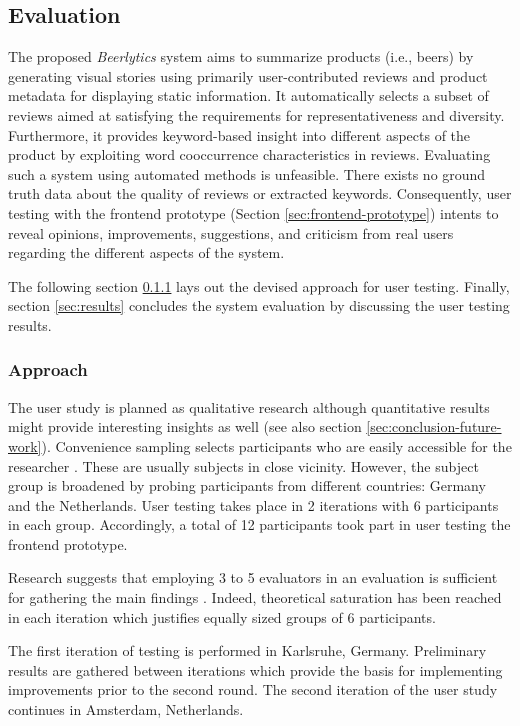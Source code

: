 \subsection{Evaluation} \label{sec:evaluation}
The proposed \textit{Beerlytics} system aims to summarize products (i.e., beers) by generating visual stories using primarily user-contributed reviews and product metadata for displaying static information.
It automatically selects a subset of reviews aimed at satisfying the requirements for representativeness and diversity.
Furthermore, it provides keyword-based insight into different aspects of the product by exploiting word cooccurrence characteristics in reviews.
Evaluating such a system using automated methods is unfeasible.
There exists no ground truth data about the quality of reviews or extracted keywords.
Consequently, user testing with the frontend prototype (Section \ref{sec:frontend-prototype}) intents to reveal opinions, improvements, suggestions, and criticism from real users regarding the different aspects of the system.

The following section \ref{sec:approach} lays out the devised approach for user testing.
Finally, section \ref{sec:results} concludes the system evaluation by discussing the user testing results.


\subsubsection{Approach} \label{sec:approach}
The user study is planned as qualitative research although quantitative results might provide interesting insights as well (see also section \ref{sec:conclusion-future-work}).
Convenience sampling selects participants who are easily accessible for the researcher \cite{Marshall1996}.
These are usually subjects in close vicinity.
However, the subject group is broadened by probing participants from different countries: Germany and the Netherlands.
User testing takes place in 2 iterations with 6 participants in each group.
Accordingly, a total of 12 participants took part in user testing the frontend prototype.

Research suggests that employing 3 to 5 evaluators in an evaluation is sufficient for gathering the main findings \cite{Nielsen1990}.
Indeed, theoretical saturation has been reached in each iteration which justifies equally sized groups of 6 participants.

The first iteration of testing is performed in Karlsruhe, Germany.
Preliminary results are gathered between iterations which provide the basis for implementing improvements prior to the second round.
The second iteration of the user study continues in Amsterdam, Netherlands.

